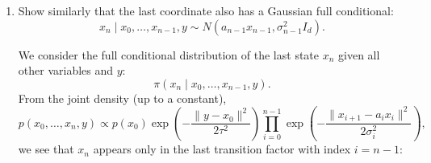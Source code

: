 \documentclass[answers,12pt,addpoints]{exam}
\begin{document}
\begin{enumerate}
\begin{enumerate}
\begin{solution}
We now show this is a multivariate normal density in $x_i$ by completing the
square. Expand the two quadratic terms:
\[
\|x_i - a_{i-1}x_{i-1}\|^2
= x_i^\top x_i - 2 x_i^\top a_{i-1}x_{i-1} + \|a_{i-1}x_{i-1}\|^2,
\]
\[
\|x_{i+1} - a_i x_i\|^2
= x_{i+1}^\top x_{i+1}
- 2 x_{i+1}^\top a_i x_i
+ x_i^\top a_i^2 x_i.
\]
Discarding terms that do not depend on $x_i$, we obtain that the exponent is
\[
-\frac{1}{2}
\left[
    x_i^\top\left(\frac{1}{\sigma_{i-1}^2} I_d + \frac{a_i^2}{\sigma_i^2} I_d\right)x_i
    - 2 x_i^\top\left(
        \frac{a_{i-1}}{\sigma_{i-1}^2} x_{i-1}
        + \frac{a_i}{\sigma_i^2} x_{i+1}
    \right)
\right]
+ \text{const},
\]
where ``const'' denotes terms not depending on $x_i$. Define
\[
\Lambda_i
= \left(
    \frac{1}{\sigma_{i-1}^2}
    + \frac{a_i^2}{\sigma_i^2}
\right) I_d,
\qquad
b_i
= \frac{a_{i-1}}{\sigma_{i-1}^2} x_{i-1}
  + \frac{a_i}{\sigma_i^2} x_{i+1}.
\]
Then the exponent can be written as
\[
-\frac{1}{2}\left(x_i^\top \Lambda_i x_i - 2 x_i^\top b_i\right) + \text{const}
= -\frac{1}{2}(x_i - m_i)^\top \Lambda_i (x_i - m_i) + \text{const}',
\]
where
\[
m_i = \Lambda_i^{-1} b_i
= \frac{
    \frac{a_{i-1}}{\sigma_{i-1}^2} x_{i-1}
    + \frac{a_i}{\sigma_i^2} x_{i+1}
}{
    \frac{1}{\sigma_{i-1}^2} + \frac{a_i^2}{\sigma_i^2}
},
\]
and the covariance matrix is
\[
\Sigma_i = \Lambda_i^{-1}
= \left(
    \frac{1}{\sigma_{i-1}^2}
    + \frac{a_i^2}{\sigma_i^2}
\right)^{-1} I_d.
\]
Thus, the full conditional distribution of $x_i$ given all other variables and
$y$ is multivariate Gaussian:
\[
x_i \mid x_{i-1},x_{i+1},\text{rest}
\sim N\bigl(m_i,\Sigma_i\bigr),
\]
with mean $m_i$ and covariance $\Sigma_i$ as above. In particular, the
conditional depends on the other variables only through $x_{i-1}$ and $x_{i+1}$,
as claimed.
        \end{solution}
        \item Show similarly that the last coordinate also has a Gaussian full conditional:
        \[
        x_n \mid x_0, \ldots, x_{n-1}, y \sim N(a_{n-1} x_{n-1}, \sigma_{n-1}^2 I_d).
        \]
        \begin{solution}
            We consider the full conditional distribution of the last state $x_n$ given all
other variables and $y$:
\[
\pi(x_n \mid x_0,\dots,x_{n-1},y).
\]
From the joint density (up to a constant),
\[
p(x_0,\dots,x_n,y)
\propto
p(x_0)
\exp\!\left(
    -\frac{\|y - x_0\|^2}{2\tau^2}
\right)
\prod_{i=0}^{n-1}
\exp\!\left(
    -\frac{\|x_{i+1} - a_i x_i\|^2}{2\sigma_i^2}
\right),
\]
we see that $x_n$ appears only in the last transition factor with index $i=n-1$:

\end{solution}
\end{enumerate}
\end{enumerate}
\end{document}
